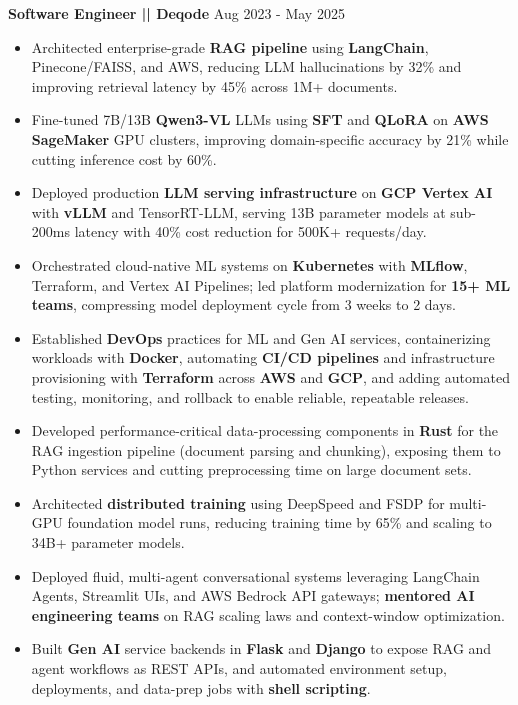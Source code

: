 \documentclass[100pt,a4paper]{article}
\begin{document}
\vspace{5pt}
\textbf{Software Engineer || Deqode}
\hfill Aug 2023 - May 2025
\begin{itemize}
\vspace{2pt}
\item {Architected enterprise-grade \textbf{RAG pipeline} using \textbf{LangChain}, Pinecone/FAISS, and AWS, reducing LLM hallucinations by 32\% and improving retrieval latency by 45\% across 1M+ documents.}
\item {Fine-tuned 7B/13B \textbf{Qwen3-VL} LLMs using \textbf{SFT} and \textbf{QLoRA} on \textbf{AWS SageMaker} GPU clusters, improving domain-specific accuracy by 21\% while cutting inference cost by 60\%.}
\item {Deployed production \textbf{LLM serving infrastructure} on \textbf{GCP Vertex AI} with \textbf{vLLM} and TensorRT-LLM, serving 13B parameter models at sub-200ms latency with 40\% cost reduction for 500K+ requests/day.}
\item {Orchestrated cloud-native ML systems on \textbf{Kubernetes} with \textbf{MLflow}, Terraform, and Vertex AI Pipelines; led platform modernization for \textbf{15+ ML teams}, compressing model deployment cycle from 3 weeks to 2 days.}
\item {Established \textbf{DevOps} practices for ML and Gen AI services, containerizing workloads with \textbf{Docker}, automating \textbf{CI/CD pipelines} and infrastructure provisioning with \textbf{Terraform} across \textbf{AWS} and \textbf{GCP}, and adding automated testing, monitoring, and rollback to enable reliable, repeatable releases.}
\item {Developed performance-critical data-processing components in \textbf{Rust} for the RAG ingestion pipeline (document parsing and chunking), exposing them to Python services and cutting preprocessing time on large document sets.}
\item {Architected \textbf{distributed training} using DeepSpeed and FSDP for multi-GPU foundation model runs, reducing training time by 65\% and scaling to 34B+ parameter models.}
\item {Deployed fluid, multi-agent conversational systems leveraging LangChain Agents, Streamlit UIs, and AWS Bedrock API gateways; \textbf{mentored AI engineering teams} on RAG scaling laws and context-window optimization.}
\item {Built \textbf{Gen AI} service backends in \textbf{Flask} and \textbf{Django} to expose RAG and agent workflows as REST APIs, and automated environment setup, deployments, and data-prep jobs with \textbf{shell scripting}.}

\end{itemize}
\end{document}
